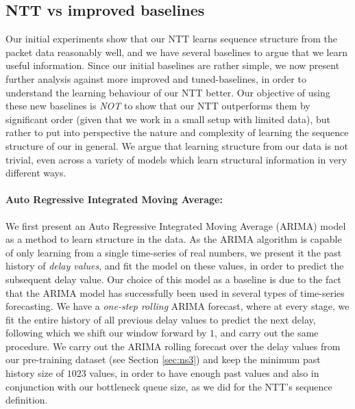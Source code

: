 \subsection{NTT vs improved baselines}
\label{ssec:impbase}

Our initial experiments show that our NTT learns sequence structure from the packet data reasonably well, and we have several baselines to argue that we learn useful information. Since our initial baselines are rather simple, we now present further analysis against more improved and tuned-baselines, in order to understand the learning behaviour of our NTT better. Our objective of using these new baselines is \emph{NOT} to show that our NTT outperforms them by significant order (given that we work in a small setup with limited data), but rather to put into perspective the nature and complexity of learning the sequence structure of our in general. We argue that learning structure from our data is not trivial, even across a variety of models which learn structural information in very different ways.

\paragraph*{Auto Regressive Integrated Moving Average:}

We first present an Auto Regressive Integrated Moving Average (ARIMA)\cite{arima} model as a method to learn structure in the data. As the ARIMA algorithm is capable of only learning from a single time-series of real numbers, we present it the past history of \emph{delay values}, and fit the model on these values, in order to predict the subsequent delay value. Our choice of this model as a baseline is due to the fact that the ARIMA  model has successfully been used in several types of time-series forecasting\cite{arimasuc}. We have a \emph{one-step rolling} ARIMA forecast, where at every stage, we fit the entire history of all previous delay values to predict the next delay, following which we shift our window forward by $1$, and carry out the same procedure. We carry out the ARIMA rolling forecast over the delay values from our pre-training dataset (see Section \ref{sec:ns3}) and keep the minimum past history size of $1023$ values, in order to have enough past values and also in conjunction with our bottleneck queue size, as we did for the NTT's sequence definition.

